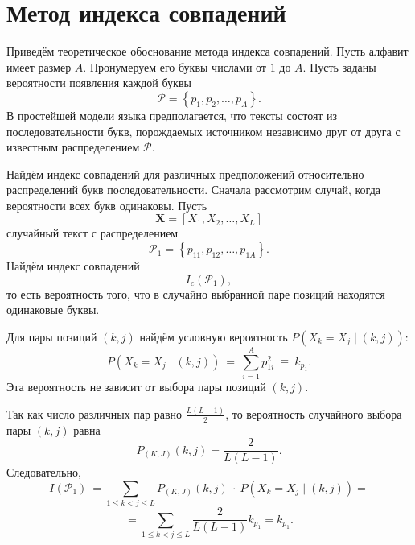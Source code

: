 \section{Метод индекса совпадений}
\label{chap:coincide-index}

Приведём теоретическое обоснование метода индекса совпадений. Пусть алфавит имеет размер $A$. Пронумеруем его буквы числами от $1$ до $A$. Пусть заданы вероятности появления каждой буквы
    \[ \mathcal{P} = \left\{ {p_1 ,p_2 , \ldots , p_A } \right\}. \]
В простейшей модели языка предполагается, что тексты состоят из последовательности букв, порождаемых источником независимо друг от друга с известным распределением $\mathcal{P}$.

Найдём индекс совпадений для различных предположений относительно распределений букв последовательности. Сначала рассмотрим случай, когда вероятности всех букв одинаковы. Пусть
    \[ \mathbf{X} = \left[ X_1, X_2, \dots, X_L \right] \]
случайный текст с распределением
    \[ \mathcal{P}_1 = \left\{ p_{11}, p_{12}, \dots, p_{1A} \right\}. \]
Найдём индекс совпадений
    \[ I_c(\mathcal{P}_1), \]
то есть вероятность того, что в случайно выбранной паре позиций находятся одинаковые буквы.

Для пары позиций $(k,j)$ найдём условную вероятность $P \left( X_k  = X_j \mid (k,j) \right)$:
    \[ P \left( X_k  = X_j \mid (k,j) \right) ~=~ \sum\limits_{i=1}^A p_{1i}^2 ~\equiv~ k_{p_1}. \]
Эта вероятность не зависит от выбора пары позиций $(k,j)$.

Так как число различных пар равно $\frac{L(L - 1)}{2}$, то вероятность случайного выбора пары $(k,j)$ равна
    \[ P_{(K,J)} (k,j) = \frac{2}{L(L - 1)}. \]
Следовательно,
\[
    I(\mathcal{P}_1) ~= \sum \limits_{1 \leq k < j \leq L} P_{(K,J)}(k,j) ~\cdot~ P(X_k  = X_j \mid (k,j)) =
\] \[
    = \sum \limits_{1 \leq k < j \leq L} \frac{2}{L(L - 1)} k_{p_1} = k_{p_1}.
\]

